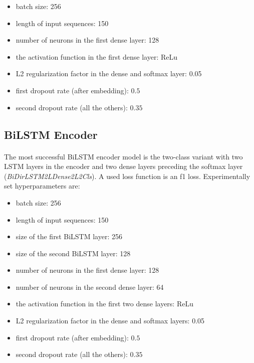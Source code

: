\begin{itemize}
	\item batch size: 256
	\item length of input sequences: 150
	\item number of neurons in the first dense layer: 128
	\item the activation function in the first dense layer: ReLu
	\item L2 regularization factor in the dense and softmax layer: 0.05
	\item first dropout rate (after embedding): $0.5$
	\item second dropout rate (all the others): $0.35$
\end{itemize}

\subsection{BiLSTM Encoder}
\paragraph{}
The most successful BiLSTM encoder model is the two-class variant with two LSTM layers in the encoder and two dense layers preceding the softmax layer (\textit{BiDirLSTM2LDense2L2Cls}). A used loss function is an f1 loss. Experimentally set hyperparameters are:

\begin{itemize}
	\item batch size: 256
	\item length of input sequences: 150
	\item size of the first BiLSTM layer: 256
	\item size of the second BiLSTM layer: 128
	\item number of neurons in the first dense layer: 128
	\item number of neurons in the second dense layer: 64
	\item the activation function in the first two dense layers: ReLu
	\item L2 regularization factor in the dense and softmax layers: 0.05
	\item first dropout rate (after embedding): $0.5$
	\item second dropout rate (all the others): $0.35$
\end{itemize}

